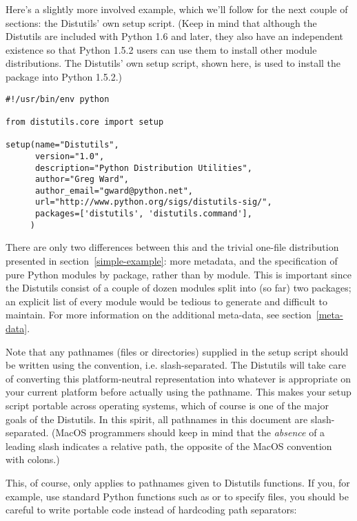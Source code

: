 \documentclass{howto}
\begin{document}
Here's a slightly more involved example, which we'll follow for the next
couple of sections: the Distutils' own setup script.  (Keep in mind that
although the Distutils are included with Python 1.6 and later, they also
have an independent existence so that Python 1.5.2 users can use them to
install other module distributions.  The Distutils' own setup script,
shown here, is used to install the package into Python 1.5.2.)

\begin{verbatim}
#!/usr/bin/env python

from distutils.core import setup

setup(name="Distutils",
      version="1.0",
      description="Python Distribution Utilities",
      author="Greg Ward",
      author_email="gward@python.net",
      url="http://www.python.org/sigs/distutils-sig/",
      packages=['distutils', 'distutils.command'],
     )
\end{verbatim}

There are only two differences between this and the trivial one-file
distribution presented in section~\ref{simple-example}: more
metadata, and the specification of pure Python modules by package,
rather than by module.  This is important since the Distutils consist of
a couple of dozen modules split into (so far) two packages; an explicit
list of every module would be tedious to generate and difficult to
maintain.  For more information on the additional meta-data, see
section~\ref{meta-data}.

Note that any pathnames (files or directories) supplied in the setup
script should be written using the \UNIX{} convention, i.e.
slash-separated.  The Distutils will take care of converting this
platform-neutral representation into whatever is appropriate on your
current platform before actually using the pathname.  This makes your
setup script portable across operating systems, which of course is one
of the major goals of the Distutils.  In this spirit, all pathnames in
this document are slash-separated.  (MacOS programmers should keep in
mind that the \emph{absence} of a leading slash indicates a relative
path, the opposite of the MacOS convention with colons.)

This, of course, only applies to pathnames given to Distutils
functions.  If you, for example, use standard Python functions such as
 or  to specify files, you
should be careful to write portable code instead of hardcoding path
separators:
\end{document}
